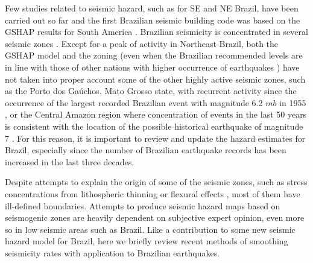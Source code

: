 \documentclass[draft, grl]{agutex}
\begin{document}
\begin{article}
Few studies related to seismic hazard, such as \citet{berrocal_1996,santos_2010} for SE and NE Brazil, have been carried out so far and the first Brazilian seismic building code \citep{nbr_15421_2006,santos_lima_2008} was based on the GSHAP \citep{giardini_1999} results for South America \citep{tanner_shepherd_1997, shedlock_tanner_1999}. Brazilian seismicity is concentrated in several seismic zones \citep{berrocal_1984, assumpcao_et_al_2014}. Except for a peak of activity in Northeast Brazil, both the GSHAP model and the \citet{nbr_15421_2006} zoning (even when the Brazilian recommended levels are in line with those of other nations with higher occurrence of earthquakes \citep{santos_2013}) have not taken into proper account some of the other highly active seismic zones, such as the Porto dos Gaúchos, Mato Grosso state, with recurrent activity since the occurrence of the largest recorded Brazilian event with magnitude 6.2 $mb$ in 1955 \citep{barros_2009}, or the Central Amazon region where concentration of events in the last 50 years is consistent with the location of the possible historical earthquake of magnitude 7 \citep{veloso_2014}. For this reason, it is important to review and update the hazard estimates for Brazil, especially since the number of Brazilian earthquake records has been increased in the last three decades. %

Despite attempts to explain the origin of some of the seismic zones, such as stress concentrations from lithospheric thinning \citep{assumpcao_2004, assumpcao_et_al_2014, azevedo_2015} or flexural effects \citep{zoback_1996, assumpcao_sacek_2013}, most of them have ill-defined boundaries. Attempts to produce seismic hazard maps \citep{dourado_2014} based on seismogenic zones are heavily dependent on subjective expert opinion, even more so in low seismic areas such as Brazil. Like a contribution to some new seismic hazard model for Brazil, here we briefly review recent methods of smoothing seismicity rates with application to Brazilian earthquakes.




\end{article}
\end{document}
